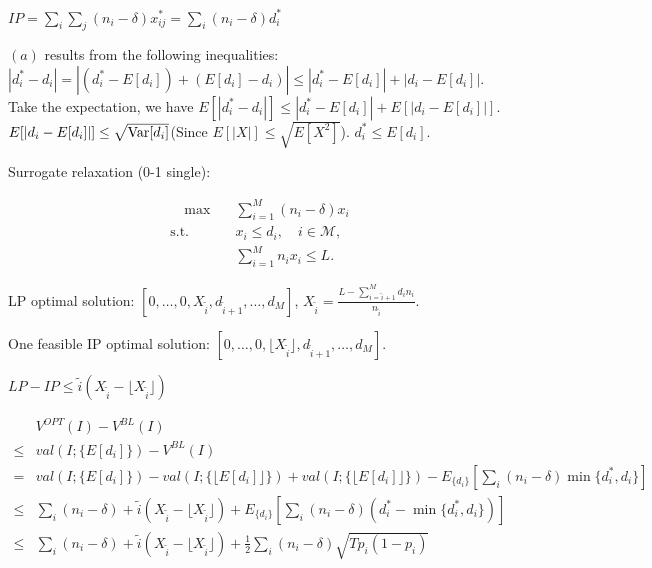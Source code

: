 $IP = \sum_{i} \sum_{j} (n_{i} - \delta) x_{ij}^{*} = \sum_{i} (n_{i} - \delta) d_{i}^{*}$

$(a)$ results from the following inequalities: $|d_{i}^{*} -d_{i}| = |(d_{i}^{*}-E[d_{i}]) + (E[d_{i}] -d_{i})| \leq |d_{i}^{*}-E[d_{i}]| + |d_{i} - E[d_{i}]|$. Take the expectation, we have $E[|d_{i}^{*} -d_{i}|]\leq |d_{i}^{*}-E[d_{i}]| + E[|d_{i} - E[d_{i}]|]$. $E[|d_{i} - E[d_{i}]|] \leq \sqrt{\operatorname{{Var}}[d_{i}]}$(Since $E[|X|] \leq \sqrt{E[X^{2}]}$). $d_{i}^{*} \leq E[d_{i}]$.




Surrogate relaxation (0-1 single):

\begin{align}\label{one_row}
    \quad \max \quad & \sum_{i = 1}^{M} (n_i - \delta) x_{i} \\
    \text {s.t.} \quad & x_{i} \leq d_{i}, \quad i \in \mathcal{M},  \\ 
    & \sum_{i=1}^{M} n_{i} x_{i} \leq L.
\end{align}

LP optimal solution: $[0, \ldots, 0, X_{\tilde{i}}, d_{\tilde{i}+1}, \ldots, d_{M}]$, $X_{\tilde{i}} = \frac{L - \sum_{i = \tilde{i}+1}^{M} {d_i n_i}}{n_{\tilde{i}}}.$

One feasible IP optimal solution: $[0, \ldots, 0, \lfloor X_{\tilde{i}} \rfloor, d_{\tilde{i}+1}, \ldots, d_{M}]$.

$LP - IP \leq \tilde{i} (X_{\tilde{i}} - \lfloor X_{\tilde{i}} \rfloor)$


\begin{align*}
    & V^{OPT}(I) - V^{BL}(I) \\
 \leq & val(I; \{E[d_{i}]\}) - V^{BL}(I) \\
 = & val(I; \{E[d_{i}]\}) - val(I; \{\lfloor E[d_{i}]\rfloor\}) + val(I; \{\lfloor E[d_{i}]\rfloor\}) - E_{\{d_{i}\}}[\sum_{i} (n_{i}-\delta) \min\{d_{i}^{*}, d_{i}\}] \\
 \leq & \sum_{i} (n_{i} - \delta) + \tilde{i} (X_{\tilde{i}} - \lfloor X_{\tilde{i}} \rfloor) + E_{\{d_{i}\}}[\sum_{i} (n_{i}-\delta) (d_{i}^{*} - \min\{d_{i}^{*}, d_{i}\})] \\
 \leq & \sum_{i} (n_{i} - \delta) + \tilde{i} (X_{\tilde{i}} - \lfloor X_{\tilde{i}} \rfloor) + \frac{1}{2} \sum_{i} (n_{i}-\delta) \sqrt{T p_{i} (1- p_{i})}
 \end{align*}
 


